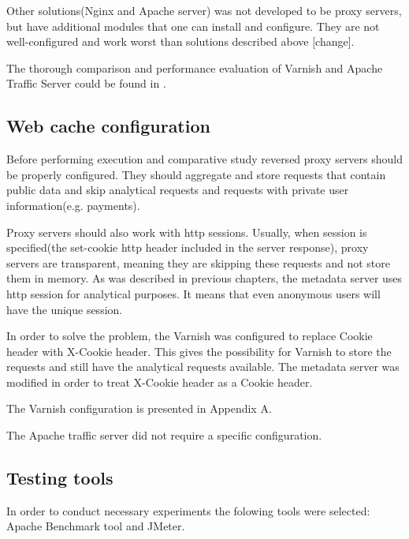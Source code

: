 Other solutions(Nginx and Apache server) was not developed to be proxy servers, but have additional modules that one can install and configure. They are not well-configured and work worst than solutions described above \cite{GuApacheTrafficUri}[change].

The thorough comparison and performance evaluation of Varnish and Apache Traffic Server could be found in \cite{VarnApacheReverse}.    


\subsection{Web cache configuration}

Before performing execution and comparative study reversed proxy servers should be properly configured. They should aggregate and store requests that contain public data and skip analytical requests and requests with private user information(e.g. payments).

Proxy servers should also work with http sessions. Usually, when session is specified(the set-cookie http header included in the server response), proxy servers are transparent, meaning they are skipping these requests and not store them in memory. As was described in previous chapters, the metadata server uses http session for analytical purposes. It means that even anonymous users will have the unique session. 

In order to solve the problem, the Varnish was configured to replace Cookie header with X-Cookie header. This gives the possibility for Varnish to store the requests and still have the analytical requests available. The metadata server was modified in order to treat X-Cookie header as a Cookie header.   

The Varnish configuration is presented in Appendix A.

The Apache traffic server did not require a specific configuration. 

\subsection{Testing tools}

In order to conduct necessary experiments the folowing tools were selected: Apache Benchmark tool and JMeter.


